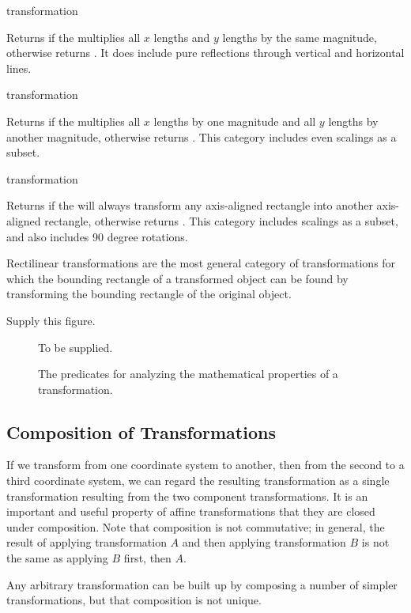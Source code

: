  {transformation}

Returns  if the   multiplies
all $x$ lengths and $y$ lengths by the same magnitude, otherwise returns
.  It does include pure reflections through vertical and horizontal
lines.

 {transformation}

Returns  if the   multiplies
all $x$ lengths by one magnitude and all $y$ lengths by another magnitude,
otherwise returns .  This category includes even scalings as a
subset.

 {transformation}

Returns  if the   will
always transform any axis-aligned rectangle into another axis-aligned rectangle,
otherwise returns .  This category includes scalings as a subset,
and also includes 90 degree rotations.

Rectilinear transformations are the most general category of transformations for
which the bounding rectangle of a transformed object can be found by
transforming the bounding rectangle of the original object.

 {Supply this figure.}

\begin{figure}
\centerline{To be supplied.}
\caption{The predicates for analyzing the mathematical properties of a transformation.}  
\end{figure}


\subsection {Composition of Transformations}

If we transform from one coordinate system to another, then from the second to a
third coordinate system, we can regard the resulting transformation as a single
transformation resulting from  the two component
transformations.  It is an important and useful property of affine transformations
that they are closed under composition.  Note that composition is not commutative;
in general, the result of applying transformation $A$ and then applying
transformation $B$ is not the same as applying $B$ first, then $A$.

Any arbitrary transformation can be built up by composing a number of simpler
transformations, but that composition is not unique.

